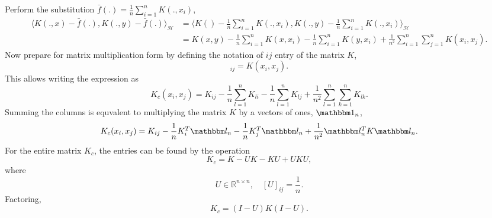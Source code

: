 \documentclass{article}[12pt]
\begin{document}
\begin{enumerate}
	Perform the substitution $\bar f (.) = \frac{1}{n} \sum^{n}_{i=1} K(., x_i)$,
	\begin{equation}
		\begin{aligned}
			\langle K(., x) - \bar f(.), K(., y) - \bar f(.) \rangle_{\mathcal H} &= \langle K() - \frac{1}{n} \sum^{n}_{i=1} K(., x_i) , K(., y) - \frac{1}{n} \sum^{n}_{i=1} K(., x_i)  \rangle_{\mathcal H} \\
											      &= K(x,y) - \frac{1}{n} \sum^{n}_{i=1} K(x, x_i) - \frac{1}{n} \sum^{n}_{i=1} K(y, x_i) + \frac{1}{n^2} \sum^{n}_{i=1} \sum^{n}_{j=1} K(x_i, x_j).        
		\end{aligned}
	\end{equation}
	Now prepare for matrix multiplication form by defining the notation of $ij$ entry of the matrix $K$,
\begin{equation}
	[K]_{ij} = K(x_i, x_j).
\end{equation}
This allows writing the expression as
\begin{equation}
	K_c (x_i, x_j) = K_{ij} - \frac{1}{n} \sum^{n}_{l=1} K_{li} - \frac{1}{n} \sum^{n}_{l=1} K_{lj} + \frac{1}{n^2} \sum^{n}_{l=1} \sum^{n}_{k=1} K_{lk}.
\end{equation}
Summing the columns is equvalent to multiplying the matrix $K$ by a vectors of ones, $\mathbbm 1_n$,
\begin{equation}
	K_c(x_i, x_j) = K_{ij} - \frac{1}{n} K^T_i \mathbbm l_n - \frac{1}{n} K^T_j \mathbbm l_n + \frac{1}{n^2} \mathbbm l_n^T K \mathbbm l_n.   
\end{equation}
For the entire matrix $K_c$, the entries can be found by the operation
\begin{equation}
	K_c = K - UK -KU + UKU,
\end{equation}
where 
\begin{equation}
	U \in \mathbb R^{n \times n}, \quad [U]_{ij} = \frac{1}{n}. 
\end{equation}
Factoring,
\begin{equation}
	K_c = (I-U)K(I-U).
\end{equation}


\end{enumerate}
\end{document}
